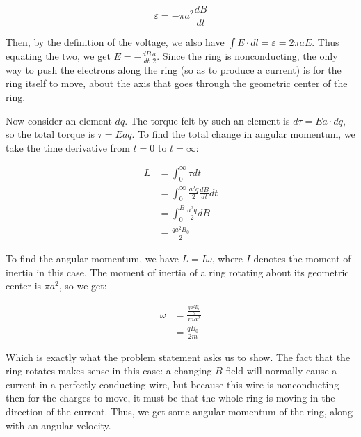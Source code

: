 \documentclass{article}
\theoremstyle{definition}
\numberwithin{equation}{section}
\numberwithin{definition}{section}
\begin{document}
\[ \varepsilon = -\pi a^2 \frac{dB}{dt}\]

Then, by the definition of the voltage, we also have $\int E \cdot dl = \varepsilon = 2\pi aE$. Thus equating the two, we get $E = -\frac{dB}{dt} \frac{a}{2}$. Since the ring is nonconducting, the only way to push the electrons along the ring (so as to produce a current) is for the ring itself to move, about the axis that goes through the geometric center of the ring. 

Now consider an element $dq$. The torque felt by such an element is $d\tau = Ea \cdot dq$, so the total torque is $\tau = Eaq$. To find the total change in angular momentum, we take the time derivative from $t = 0$ to $t = \infty$:

\begin{align*}
    L &= \int_0^\infty \tau dt\\
    &= \int_0^\infty \frac{a^2q}{2}\frac{dB}{dt} dt\\
    &= \int_0^B \frac{a^2q}{2} dB\\
    &= \frac{qa^2B_0}{2}
\end{align*}


To find the angular momentum, we have $L = I\omega$, where $I$ denotes the moment of inertia in this case. The moment of inertia of a ring rotating about its geometric center is $\pi a^2$, so we get: 

\begin{align*}
    \omega &= \frac{\frac{qa^2B_0}{2}}{ma^2}\\
    &= \frac{qB_0}{2m}
\end{align*}

Which is exactly what the problem statement asks us to show. The fact that the ring rotates makes sense in this case: a changing $B$ field will normally cause a current in a perfectly conducting wire, but because this wire is nonconducting then for the charges to move, it must be that the whole ring is moving in the direction of the current. Thus, we get some angular momentum of the ring, along with an angular velocity.
\end{document}
